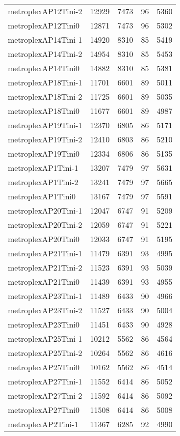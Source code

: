 \begin{longtable}{lrrrr}
metroplexAP12Tini-2 & 12929 & 7473 & 96 & 5360 \\
metroplexAP12Tini0 & 12871 & 7473 & 96 & 5302 \\
metroplexAP14Tini-1 & 14920 & 8310 & 85 & 5419 \\
metroplexAP14Tini-2 & 14954 & 8310 & 85 & 5453 \\
metroplexAP14Tini0 & 14882 & 8310 & 85 & 5381 \\
metroplexAP18Tini-1 & 11701 & 6601 & 89 & 5011 \\
metroplexAP18Tini-2 & 11725 & 6601 & 89 & 5035 \\
metroplexAP18Tini0 & 11677 & 6601 & 89 & 4987 \\
metroplexAP19Tini-1 & 12370 & 6805 & 86 & 5171 \\
metroplexAP19Tini-2 & 12410 & 6803 & 86 & 5210 \\
metroplexAP19Tini0 & 12334 & 6806 & 86 & 5135 \\
metroplexAP1Tini-1 & 13207 & 7479 & 97 & 5631 \\
metroplexAP1Tini-2 & 13241 & 7479 & 97 & 5665 \\
metroplexAP1Tini0 & 13167 & 7479 & 97 & 5591 \\
metroplexAP20Tini-1 & 12047 & 6747 & 91 & 5209 \\
metroplexAP20Tini-2 & 12059 & 6747 & 91 & 5221 \\
metroplexAP20Tini0 & 12033 & 6747 & 91 & 5195 \\
metroplexAP21Tini-1 & 11479 & 6391 & 93 & 4995 \\
metroplexAP21Tini-2 & 11523 & 6391 & 93 & 5039 \\
metroplexAP21Tini0 & 11439 & 6391 & 93 & 4955 \\
metroplexAP23Tini-1 & 11489 & 6433 & 90 & 4966 \\
metroplexAP23Tini-2 & 11527 & 6433 & 90 & 5004 \\
metroplexAP23Tini0 & 11451 & 6433 & 90 & 4928 \\
metroplexAP25Tini-1 & 10212 & 5562 & 86 & 4564 \\
metroplexAP25Tini-2 & 10264 & 5562 & 86 & 4616 \\
metroplexAP25Tini0 & 10162 & 5562 & 86 & 4514 \\
metroplexAP27Tini-1 & 11552 & 6414 & 86 & 5052 \\
metroplexAP27Tini-2 & 11592 & 6414 & 86 & 5092 \\
metroplexAP27Tini0 & 11508 & 6414 & 86 & 5008 \\
metroplexAP2Tini-1 & 11367 & 6285 & 92 & 4990 \\

\end{longtable}
